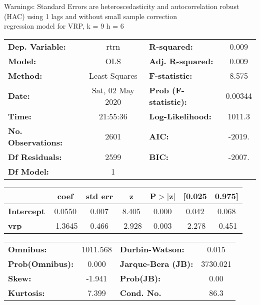 Warnings: \newline
 [1] Standard Errors are heteroscedasticity and autocorrelation robust (HAC) using 1 lags and without small sample correction\\ 

regression model for VRP, k = 9 h = 6\begin{center}
\begin{tabular}{lclc}
\toprule
\textbf{Dep. Variable:}    &       rtrn       & \textbf{  R-squared:         } &     0.009   \\
\textbf{Model:}            &       OLS        & \textbf{  Adj. R-squared:    } &     0.009   \\
\textbf{Method:}           &  Least Squares   & \textbf{  F-statistic:       } &     8.575   \\
\textbf{Date:}             & Sat, 02 May 2020 & \textbf{  Prob (F-statistic):} &  0.00344    \\
\textbf{Time:}             &     21:55:36     & \textbf{  Log-Likelihood:    } &    1011.3   \\
\textbf{No. Observations:} &        2601      & \textbf{  AIC:               } &    -2019.   \\
\textbf{Df Residuals:}     &        2599      & \textbf{  BIC:               } &    -2007.   \\
\textbf{Df Model:}         &           1      & \textbf{                     } &             \\
\bottomrule
\end{tabular}
\begin{tabular}{lcccccc}
                   & \textbf{coef} & \textbf{std err} & \textbf{z} & \textbf{P$> |$z$|$} & \textbf{[0.025} & \textbf{0.975]}  \\
\midrule
\textbf{Intercept} &       0.0550  &        0.007     &     8.405  &         0.000        &        0.042    &        0.068     \\
\textbf{vrp}       &      -1.3645  &        0.466     &    -2.928  &         0.003        &       -2.278    &       -0.451     \\
\bottomrule
\end{tabular}
\begin{tabular}{lclc}
\textbf{Omnibus:}       & 1011.568 & \textbf{  Durbin-Watson:     } &    0.015  \\
\textbf{Prob(Omnibus):} &   0.000  & \textbf{  Jarque-Bera (JB):  } & 3730.021  \\
\textbf{Skew:}          &  -1.941  & \textbf{  Prob(JB):          } &     0.00  \\
\textbf{Kurtosis:}      &   7.399  & \textbf{  Cond. No.          } &     86.3  \\
\bottomrule
\end{tabular}
\end{center}

